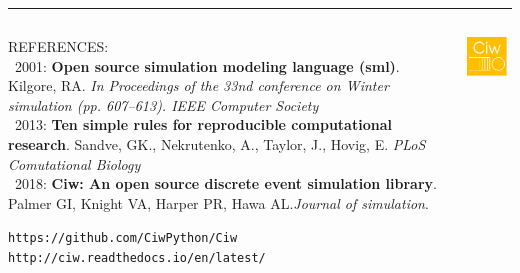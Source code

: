 \documentclass[usenames,dvipsnames,t]{beamer}
\begin{document}
\vspace{8mm}

\textcolor{textgrey}{\hrule height 3pt}

\vspace{4mm}

\begin{columns}
\begin{column}{0.88\textwidth}
\textcolor{textgrey}{\large{REFERENCES:}\vspace{2mm}}\\
\footnotesize{\textcolor{textorange}{
  \textbullet\ 2001: \textbf{Open source simulation modeling language (sml)}. Kilgore, RA. \textit{In Proceedings of the 33nd conference on Winter simulation (pp. 607–613). IEEE Computer Society}\\
  \textbullet\ 2013: \textbf{Ten simple rules for reproducible computational research}. Sandve, GK., Nekrutenko, A., Taylor, J., Hovig, E. \textit{PLoS Comutational Biology}\\
  \textbullet\ 2018: \textbf{Ciw: An open source discrete event simulation library}. Palmer GI, Knight VA, Harper PR, Hawa AL.\textit{Journal of simulation}.
}}\\[4mm]
\begin{center}
  \large{\texttt{https://github.com/CiwPython/Ciw} \hspace{80mm} \texttt{http://ciw.readthedocs.io/en/latest/}}
\end{center}
\end{column}
\begin{column}{0.1\textwidth}
  \begin{center}
  \vspace{-5mm}
  \includegraphics[width=0.9\textwidth]{ciwlogo}
  \end{center}
\end{column}
\end{columns}
\end{document}
